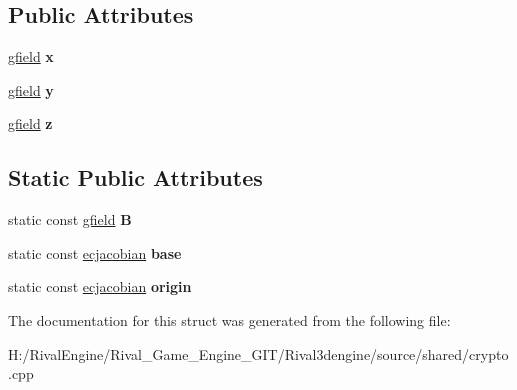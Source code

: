 \subsection*{Public Attributes}
\begin{DoxyCompactItemize}
\item 
\mbox{\label{structecjacobian_a2f81443c8b363b8a4983c55634bdb4b2}} 
\hyperlink{structgfield}{gfield} {\bfseries x}
\item 
\mbox{\label{structecjacobian_abb5fa282ef4817537886493c49217b16}} 
\hyperlink{structgfield}{gfield} {\bfseries y}
\item 
\mbox{\label{structecjacobian_a3b9cb207ffa77ea4efca837c91952499}} 
\hyperlink{structgfield}{gfield} {\bfseries z}
\end{DoxyCompactItemize}
\subsection*{Static Public Attributes}
\begin{DoxyCompactItemize}
\item 
\mbox{\label{structecjacobian_a987dc64d4f39332c3536f4d1a4264abb}} 
static const \hyperlink{structgfield}{gfield} {\bfseries B}
\item 
\mbox{\label{structecjacobian_af53d82b93db9e3f054b16010306d5141}} 
static const \hyperlink{structecjacobian}{ecjacobian} {\bfseries base}
\item 
\mbox{\label{structecjacobian_a760e477cb6b7ec8a01e672832cd1ee2b}} 
static const \hyperlink{structecjacobian}{ecjacobian} {\bfseries origin}
\end{DoxyCompactItemize}


The documentation for this struct was generated from the following file\+:\begin{DoxyCompactItemize}
\item 
H\+:/\+Rival\+Engine/\+Rival\+\_\+\+Game\+\_\+\+Engine\+\_\+\+G\+I\+T/\+Rival3dengine/source/shared/crypto.\+cpp\end{DoxyCompactItemize}

